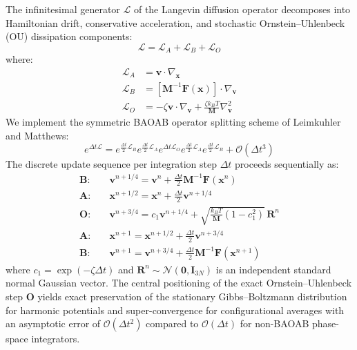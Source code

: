 \documentclass[journal=jpcbfk,manuscript=article,layout=twocolumn]{achemso}
\begin{document}
The infinitesimal generator $\mathcal{L}$ of the Langevin diffusion operator decomposes into Hamiltonian drift, conservative acceleration, and stochastic Ornstein--Uhlenbeck (OU) dissipation components:
\begin{equation}
\mathcal{L} = \mathcal{L}_A + \mathcal{L}_B + \mathcal{L}_O
\end{equation}
where:
\begin{align}
\mathcal{L}_A &= \mathbf{v} \cdot \nabla_{\mathbf{x}} \\
\mathcal{L}_B &= \left[ \mathbf{M}^{-1} \mathbf{F}(\mathbf{x}) \right] \cdot \nabla_{\mathbf{v}} \\
\mathcal{L}_O &= - \zeta \mathbf{v} \cdot \nabla_{\mathbf{v}} + \frac{\zeta k_B T}{\mathbf{M}} \nabla_{\mathbf{v}}^2
\end{align}
We implement the symmetric BAOAB operator splitting scheme of Leimkuhler and Matthews:\cite{leimkuhler2013rational}
\begin{equation}
e^{\Delta t \mathcal{L}} = e^{\frac{\Delta t}{2} \mathcal{L}_B} e^{\frac{\Delta t}{2} \mathcal{L}_A} e^{\Delta t \mathcal{L}_O} e^{\frac{\Delta t}{2} \mathcal{L}_A} e^{\frac{\Delta t}{2} \mathcal{L}_B} + \mathcal{O}(\Delta t^3)
\end{equation}
The discrete update sequence per integration step $\Delta t$ proceeds sequentially as:
\begin{align}
\mathbf{B}: \quad &\mathbf{v}^{n + 1/4} = \mathbf{v}^n + \frac{\Delta t}{2} \mathbf{M}^{-1} \mathbf{F}(\mathbf{x}^n) \\
\mathbf{A}: \quad &\mathbf{x}^{n + 1/2} = \mathbf{x}^n + \frac{\Delta t}{2} \mathbf{v}^{n + 1/4} \\
\mathbf{O}: \quad &\mathbf{v}^{n + 3/4} = c_1 \mathbf{v}^{n + 1/4} + \sqrt{\frac{k_B T}{\mathbf{M}}(1 - c_1^2)} \, \mathbf{R}^n \\
\mathbf{A}: \quad &\mathbf{x}^{n + 1} = \mathbf{x}^{n + 1/2} + \frac{\Delta t}{2} \mathbf{v}^{n + 3/4} \\
\mathbf{B}: \quad &\mathbf{v}^{n + 1} = \mathbf{v}^{n + 3/4} + \frac{\Delta t}{2} \mathbf{M}^{-1} \mathbf{F}(\mathbf{x}^{n + 1})
\end{align}
where $c_1 = \exp(-\zeta \Delta t)$ and $\mathbf{R}^n \sim \mathcal{N}(\mathbf{0}, \mathbf{I}_{3N})$ is an independent standard normal Gaussian vector. The central positioning of the exact Ornstein--Uhlenbeck step $\mathbf{O}$ yields exact preservation of the stationary Gibbs--Boltzmann distribution for harmonic potentials and super-convergence for configurational averages with an asymptotic error of $\mathcal{O}(\Delta t^2)$ compared to $\mathcal{O}(\Delta t)$ for non-BAOAB phase-space integrators.
\end{document}

